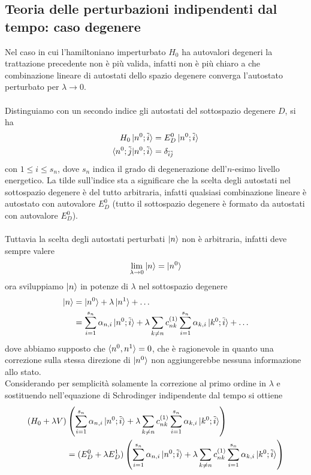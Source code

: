 \documentclass{article}
\begin{document}
\subsection{Teoria delle perturbazioni indipendenti dal tempo: caso degenere}
Nel caso in cui l'hamiltoniano imperturbato $H_0$ ha autovalori degeneri la trattazione precedente non è più valida, infatti non è più chiaro a che combinazione lineare di autostati dello spazio degenere converga l'autostato perturbato per $\lambda \rightarrow 0$. \\ \\
Distinguiamo con un secondo indice gli autostati del sottospazio degenere $D$, si ha
\begin{align}
    H_0\ket{n^0; \tilde{i}} &= E_D^0\ket{n^0; \tilde{i}} \notag \\
    \braket{n^0; \tilde{j}|n^0; \tilde{i}} &= \delta_{\tilde{i}\tilde{j}} \notag
\end{align}
con $1 \leq i \leq s_n$, dove $s_n$ indica il grado di degenerazione dell'$n$-esimo livello energetico. La tilde sull'indice sta a significare che la scelta degli autostati nel sottospazio degenere è del tutto arbitraria, infatti qualsiasi combinazione lineare è autostato con autovalore $E_D^0$ (tutto il sottospazio degenere è formato da autostati con autovalore $E_D^0$). \\ \\
Tuttavia la scelta degli autostati perturbati $\ket{n}$ non è arbitraria, infatti deve sempre valere
\begin{gather}
    \lim_{\lambda \rightarrow 0}\ket{n} = \ket{n^0} \notag
\end{gather}
ora sviluppiamo $\ket{n}$ in potenze di $\lambda$ nel sottospazio degenere
\begin{align}
    \ket{n} &= \ket{n^0} + \lambda\ket{n^1} + \dots \notag \\
    &= \sum_{i = 1}^{s_n}\alpha_{n, i}\ket{n^0; \tilde{i}} + \lambda\sum_{k \neq n}c_{nk}^{(1)}\sum_{i = 1}^{s_n}\alpha_{k, i}\ket{k^0; \tilde{i}} + \dots \notag
\end{align}
dove abbiamo supposto che $\braket{n^0, n^1} = 0$, che è ragionevole in quanto una correzione sulla stessa direzione di $\ket{n^0}$ non aggiungerebbe nessuna informazione allo stato. \\
Considerando per semplicità solamente la correzione al primo ordine in $\lambda$ e sostituendo nell'equazione di Schrodinger indipendente dal tempo si ottiene
\begin{align}
    (H_0 + \lambda V)&\left( \sum_{i = 1}^{s_n}\alpha_{n, i}\ket{n^0; \tilde{i}} + \lambda\sum_{k \neq n}c_{nk}^{(1)}\sum_{i = 1}^{s_n}\alpha_{k, i}\ket{k^0; \tilde{i}} \right) \notag \\
    &= (E_D^0 + \lambda E_D^1)\left( \sum_{i = 1}^{s_n}\alpha_{n, i}\ket{n^0; \tilde{i}} + \lambda\sum_{k \neq n}c_{nk}^{(1)}\sum_{i = 1}^{s_n}\alpha_{k, i}\ket{k^0; \tilde{i}} \right) \notag
\end{align}
\end{document}
